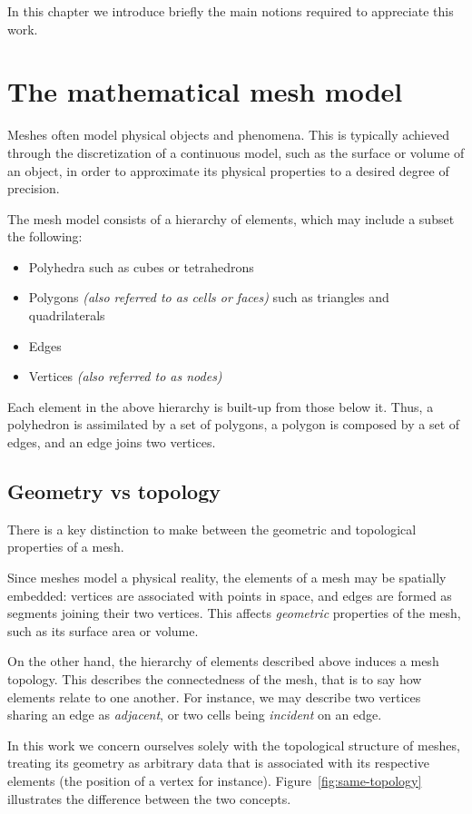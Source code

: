 In this chapter we introduce briefly the main notions required to appreciate this work.

\section{The mathematical mesh model}

Meshes often model physical objects and phenomena. This is typically achieved through the discretization of a continuous model, such as the surface or volume of an object, in order to approximate its physical properties to a desired degree of precision.
\par

The mesh model consists of a hierarchy of elements, which may include a subset the following:
\begin{itemize}
\item Polyhedra such as cubes or tetrahedrons
\item Polygons \emph{(also referred to as cells or faces)} such as triangles and quadrilaterals
\item Edges
\item Vertices \emph{(also referred to as nodes)}
\end{itemize}



Each element in the above hierarchy is built-up from those below it. Thus, a polyhedron is assimilated by a set of polygons, a polygon is composed by a set of edges, and an edge joins two vertices.


\subsection{Geometry vs topology}
There is a key distinction to make between the geometric and topological properties of a mesh.

Since meshes model a physical reality, the elements of a mesh may be spatially embedded: vertices are associated with points in space, and edges are formed as segments joining their two vertices. This affects \emph{geometric} properties of the mesh, such as its surface area or volume.

On the other hand, the hierarchy of elements described above induces a mesh topology. This describes the connectedness of the mesh, that is to say how elements relate to one another. For instance, we may describe two vertices sharing an edge as \emph{adjacent}, or two cells being \emph{incident} on an edge.
\par
In this work we concern ourselves solely with the topological structure of meshes, treating its geometry as arbitrary data that is associated with its respective elements (the position of a vertex for instance). Figure~\ref{fig:same-topology} illustrates the difference between the two concepts.

